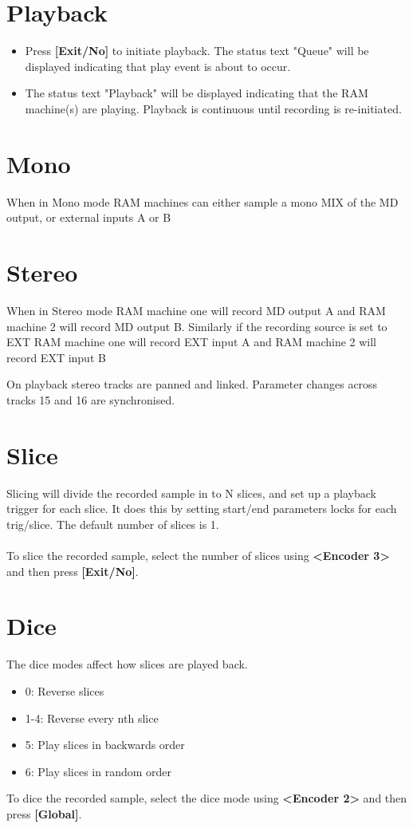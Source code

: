 \section{Playback}
\begin{itemize}
\item Press \textbf{[Exit/No]} to initiate playback. The status text "Queue" will be displayed indicating that play event is about to occur. 
\item The status text "Playback" will be displayed indicating that the RAM machine(s) are playing. Playback is continuous until recording is re-initiated. 
\end{itemize}


\section{Mono}
When in Mono mode RAM machines can either sample a mono MIX of the MD output, or external inputs A or B
\section{Stereo}
When in Stereo mode RAM machine one will record MD output A and RAM machine 2 will record MD output B. Similarly if the recording source is set to EXT RAM machine one will record EXT input A and RAM machine 2 will record EXT input B

On playback stereo tracks are panned and linked. Parameter changes across tracks 15 and 16 are synchronised.
\newpage
\section{Slice}
Slicing will divide the recorded sample in to N slices, and set up a playback trigger for each slice. It does this by setting start/end parameters locks for each trig/slice. The default number of slices is 1.\\
\\
To slice the recorded sample, select the number of slices using \textbf{<Encoder 3>} and then press \textbf{[Exit/No]}.
\\

\section{Dice}

The dice modes affect how slices are played back.
\begin{itemize}
    \item 0: Reverse slices
    \item 1-4: Reverse every nth slice
    \item 5: Play slices in backwards order
    \item 6: Play slices in random order
\end{itemize}

To dice the recorded sample, select the dice mode using \textbf{<Encoder 2>} and then press \textbf{[Global]}.

